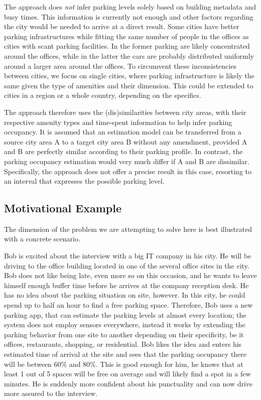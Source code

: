 	The approach does \textit{not} infer parking levels solely based on building metadata and busy times. This information is currently not enough and other factors regarding the city would be needed to arrive at a direct result. Some cities have better parking infrastructures while fitting the same number of people in the offices as cities with scant parking facilities. In the former parking are likely concentrated around the offices, while in the latter the cars are probably distributed uniformly around a larger area around the offices. To circumvent these inconsistencies between cities, we focus on single cities, where parking infrastructure is likely the same given the type of amenities and their dimension. This could be extended to cities in a region or a whole country, depending on the specifics.
	
	The approach therefore uses the (dis)similarities between city areas, with their respective amenity types and time-spent information to help infer parking occupancy. It is assumed that an estimation model can be transferred from a source city area A to a target city area B without any amendment, provided A and B are perfectly similar according to their parking profile. In contrast, the parking occupancy estimation would very much differ if A and B are dissimilar. Specifically, the approach does not offer a precise result in this case, resorting to an interval that expresses the possible parking level.
	
	\subsection{Motivational Example}
	The dimension of the problem we are attempting to solve here is best illustrated with a concrete scenario.
	
	Bob is excited about the interview with a big IT company in his city. He will be driving to the office building located in one of the several office sites in the city. Bob does not like being late, even more so on this occasion, and he wants to leave himself enough buffer time before he arrives at the company reception desk. He has no idea about the parking situation on site, however. In this city, he could spend up to half an hour to find a free parking space. Therefore, Bob uses a new parking app, that can estimate the parking levels at almost every location; the system does not employ sensors everywhere, instead it works by extending the parking behavior from one site to another depending on their specificity, be it offices, restaurants, shopping, or residential. Bob likes the idea and enters his estimated time of arrival at the site and sees that the parking occupancy there will be between 60\% and 80\%. This is good enough for him, he knows that at least 1 out of 5 spaces will be free on average and will likely find a spot in a few minutes. He is suddenly more confident about his punctuality and can now drive more assured to the interview.
	
